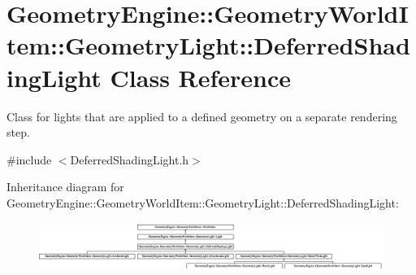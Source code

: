 \hypertarget{class_geometry_engine_1_1_geometry_world_item_1_1_geometry_light_1_1_deferred_shading_light}{}\section{Geometry\+Engine\+::Geometry\+World\+Item\+::Geometry\+Light\+::Deferred\+Shading\+Light Class Reference}
\label{class_geometry_engine_1_1_geometry_world_item_1_1_geometry_light_1_1_deferred_shading_light}


Class for lights that are applied to a defined geometry on a separate rendering step.  




{\ttfamily \#include $<$Deferred\+Shading\+Light.\+h$>$}

Inheritance diagram for Geometry\+Engine\+::Geometry\+World\+Item\+::Geometry\+Light\+::Deferred\+Shading\+Light\+:\begin{figure}[H]
\begin{center}
\leavevmode
\includegraphics[height=1.573034cm]{class_geometry_engine_1_1_geometry_world_item_1_1_geometry_light_1_1_deferred_shading_light}
\end{center}
\end{figure}
